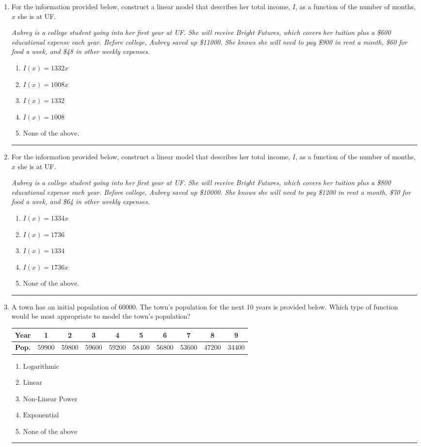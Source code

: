 \documentclass[14pt]{extbook}
\newcommand{\litem}[1]{\item#1\hspace*{-1cm}\rule{\textwidth}{0.4pt}}
\begin{document}
\begin{enumerate}
{\begin{enumerate}[label=\Alph*.]
\end{enumerate} }
\litem{
For the information provided below, construct a linear model that describes her total income, $I$, as a function of the number of months, $x$ she is at UF.
\begin{center}
    \textit{ Aubrey is a college student going into her first year at UF. She will receive Bright Futures, which covers her tuition plus a \$600 educational expense each year. Before college, Aubrey saved up \$11000. She knows she will need to pay \$900 in rent a month, \$60 for food a week, and \$48 in other weekly expenses. }
\end{center}
\begin{enumerate}[label=\Alph*.]
\item \( I(x) = 1332 x \)
\item \( I(x) = 1008 x \)
\item \( I(x) = 1332 \)
\item \( I(x) = 1008 \)
\item \( \text{None of the above.} \)

\end{enumerate} }
\litem{
For the information provided below, construct a linear model that describes her total income, $I$, as a function of the number of months, $x$ she is at UF.
\begin{center}
    \textit{ Aubrey is a college student going into her first year at UF. She will receive Bright Futures, which covers her tuition plus a \$800 educational expense each year. Before college, Aubrey saved up \$10000. She knows she will need to pay \$1200 in rent a month, \$70 for food a week, and \$64 in other weekly expenses. }
\end{center}
\begin{enumerate}[label=\Alph*.]
\item \( I(x) = 1334 x \)
\item \( I(x) = 1736 \)
\item \( I(x) = 1334 \)
\item \( I(x) = 1736 x \)
\item \( \text{None of the above.} \)

\end{enumerate} }
\litem{
A town has an initial population of 60000. The town's population for the next 10 years is provided below. Which type of function would be most appropriate to model the town's population?


\begin{tabular}{c|c|c|c|c|c|c|c|c|c}
\textbf{Year} & 1 & 2 & 3 & 4 & 5 & 6 & 7 & 8 & 9 \tabularnewline
\hline
\textbf{Pop.} & 59900 & 59800 & 59600 & 59200 & 58400 & 56800 & 53600 & 47200 & 34400
\end{tabular} \begin{enumerate}[label=\Alph*.]
\item \( \text{Logarithmic} \)
\item \( \text{Linear} \)
\item \( \text{Non-Linear Power} \)
\item \( \text{Exponential} \)
\item \( \text{None of the above} \)


\end{enumerate}}
\end{enumerate}
\end{document}
